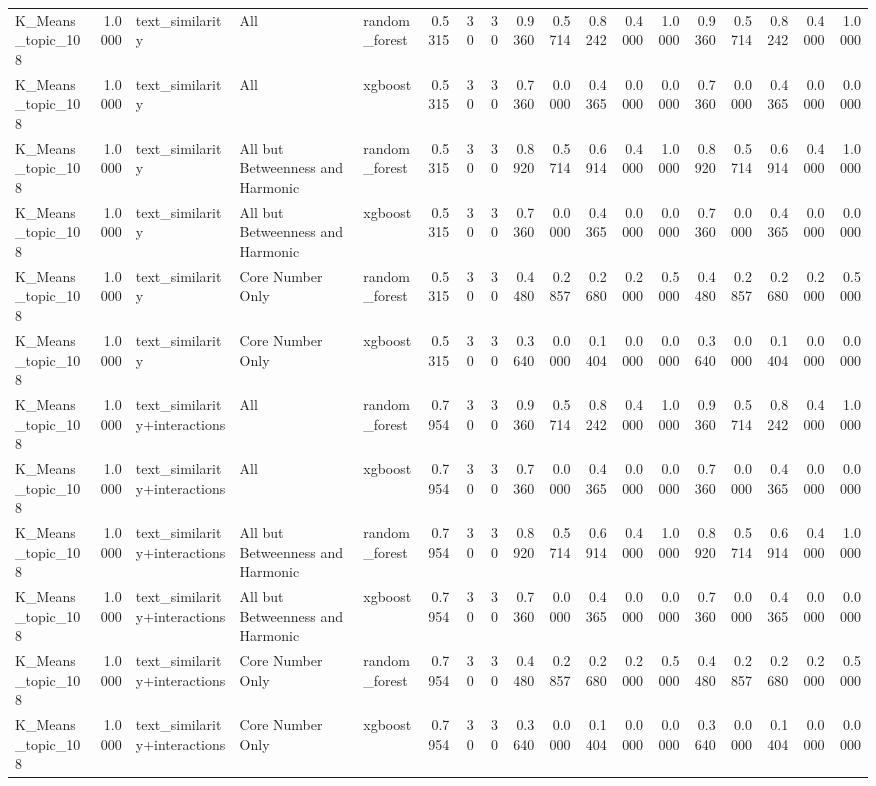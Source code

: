 \begin{tabular}{lrlllrrrrrrrrrrrrr}
K_Means_topic_108 & 1.0000 & text_similarity & All & random_forest & 0.5315 & 30 & 30 & 0.9360 & 0.5714 & 0.8242 & 0.4000 & 1.0000 & 0.9360 & 0.5714 & 0.8242 & 0.4000 & 1.0000 \\
K_Means_topic_108 & 1.0000 & text_similarity & All & xgboost & 0.5315 & 30 & 30 & 0.7360 & 0.0000 & 0.4365 & 0.0000 & 0.0000 & 0.7360 & 0.0000 & 0.4365 & 0.0000 & 0.0000 \\
K_Means_topic_108 & 1.0000 & text_similarity & All but Betweenness and Harmonic & random_forest & 0.5315 & 30 & 30 & 0.8920 & 0.5714 & 0.6914 & 0.4000 & 1.0000 & 0.8920 & 0.5714 & 0.6914 & 0.4000 & 1.0000 \\
K_Means_topic_108 & 1.0000 & text_similarity & All but Betweenness and Harmonic & xgboost & 0.5315 & 30 & 30 & 0.7360 & 0.0000 & 0.4365 & 0.0000 & 0.0000 & 0.7360 & 0.0000 & 0.4365 & 0.0000 & 0.0000 \\
K_Means_topic_108 & 1.0000 & text_similarity & Core Number Only & random_forest & 0.5315 & 30 & 30 & 0.4480 & 0.2857 & 0.2680 & 0.2000 & 0.5000 & 0.4480 & 0.2857 & 0.2680 & 0.2000 & 0.5000 \\
K_Means_topic_108 & 1.0000 & text_similarity & Core Number Only & xgboost & 0.5315 & 30 & 30 & 0.3640 & 0.0000 & 0.1404 & 0.0000 & 0.0000 & 0.3640 & 0.0000 & 0.1404 & 0.0000 & 0.0000 \\
K_Means_topic_108 & 1.0000 & text_similarity+interactions & All & random_forest & 0.7954 & 30 & 30 & 0.9360 & 0.5714 & 0.8242 & 0.4000 & 1.0000 & 0.9360 & 0.5714 & 0.8242 & 0.4000 & 1.0000 \\
K_Means_topic_108 & 1.0000 & text_similarity+interactions & All & xgboost & 0.7954 & 30 & 30 & 0.7360 & 0.0000 & 0.4365 & 0.0000 & 0.0000 & 0.7360 & 0.0000 & 0.4365 & 0.0000 & 0.0000 \\
K_Means_topic_108 & 1.0000 & text_similarity+interactions & All but Betweenness and Harmonic & random_forest & 0.7954 & 30 & 30 & 0.8920 & 0.5714 & 0.6914 & 0.4000 & 1.0000 & 0.8920 & 0.5714 & 0.6914 & 0.4000 & 1.0000 \\
K_Means_topic_108 & 1.0000 & text_similarity+interactions & All but Betweenness and Harmonic & xgboost & 0.7954 & 30 & 30 & 0.7360 & 0.0000 & 0.4365 & 0.0000 & 0.0000 & 0.7360 & 0.0000 & 0.4365 & 0.0000 & 0.0000 \\
K_Means_topic_108 & 1.0000 & text_similarity+interactions & Core Number Only & random_forest & 0.7954 & 30 & 30 & 0.4480 & 0.2857 & 0.2680 & 0.2000 & 0.5000 & 0.4480 & 0.2857 & 0.2680 & 0.2000 & 0.5000 \\
K_Means_topic_108 & 1.0000 & text_similarity+interactions & Core Number Only & xgboost & 0.7954 & 30 & 30 & 0.3640 & 0.0000 & 0.1404 & 0.0000 & 0.0000 & 0.3640 & 0.0000 & 0.1404 & 0.0000 & 0.0000 \\
\bottomrule
\end{tabular}
